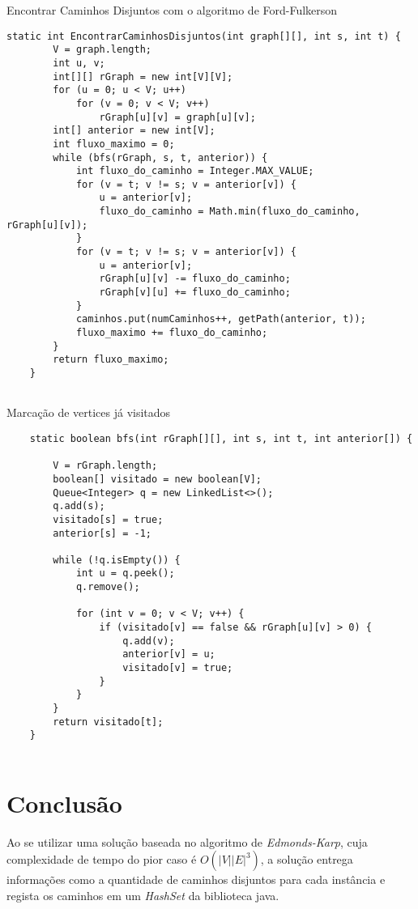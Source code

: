 \begin{algorithm}
\caption{Encontrar Caminhos Disjuntos com o algoritmo de Ford-Fulkerson}
\begin{lstlisting}
static int EncontrarCaminhosDisjuntos(int graph[][], int s, int t) {
		V = graph.length;
		int u, v;
		int[][] rGraph = new int[V][V];
		for (u = 0; u < V; u++)
			for (v = 0; v < V; v++)
				rGraph[u][v] = graph[u][v];
		int[] anterior = new int[V];
		int fluxo_maximo = 0;
		while (bfs(rGraph, s, t, anterior)) {
			int fluxo_do_caminho = Integer.MAX_VALUE;
			for (v = t; v != s; v = anterior[v]) {
				u = anterior[v];
				fluxo_do_caminho = Math.min(fluxo_do_caminho, rGraph[u][v]);
			}
			for (v = t; v != s; v = anterior[v]) {
				u = anterior[v];
				rGraph[u][v] -= fluxo_do_caminho;
				rGraph[v][u] += fluxo_do_caminho;
			}
			caminhos.put(numCaminhos++, getPath(anterior, t));
			fluxo_maximo += fluxo_do_caminho;
		}
		return fluxo_maximo;
	}
	
\end{lstlisting}
\end{algorithm}

\begin{algorithm}
\caption{Marcação de vertices já visitados}
\begin{lstlisting}
    static boolean bfs(int rGraph[][], int s, int t, int anterior[]) {

		V = rGraph.length;
		boolean[] visitado = new boolean[V];
		Queue<Integer> q = new LinkedList<>();
		q.add(s);
		visitado[s] = true;
		anterior[s] = -1;

		while (!q.isEmpty()) {
			int u = q.peek();
			q.remove();

			for (int v = 0; v < V; v++) {
				if (visitado[v] == false && rGraph[u][v] > 0) {
					q.add(v);
					anterior[v] = u;
					visitado[v] = true;
				}
			}
		}
		return visitado[t];
	}
	
\end{lstlisting}
\end{algorithm}


\section{\esp Conclusão}
Ao se utilizar uma solução baseada no algoritmo de \textit{Edmonds-Karp}, cuja complexidade de tempo do pior caso é \(O(|V| |E|^3)\), a solução entrega informações como a quantidade de caminhos disjuntos para cada instância e regista os caminhos em um \textit{HashSet} da biblioteca java. 

% 
